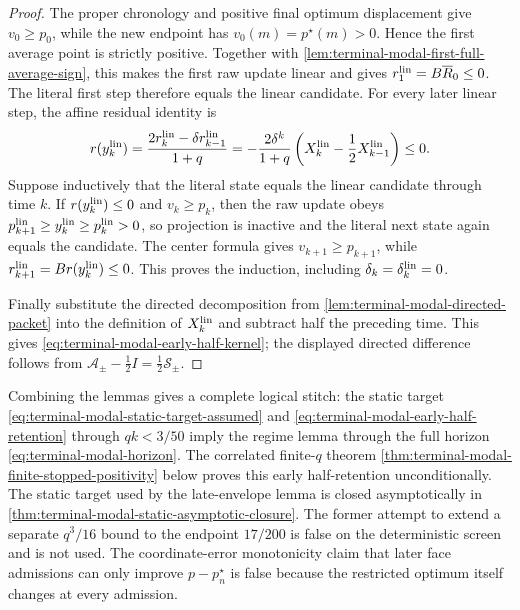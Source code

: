 \begin{proof}
The proper chronology and positive final optimum displacement give
$v_0\ge p_0$, while the new endpoint has
$v_0(m)=p^\star(m)>0$.  Hence the first average point is strictly positive.
Together with \cref{lem:terminal-modal-first-full-average-sign}, this makes
the first raw update linear and gives
$r_1^{\rm lin}=B\overline R_0\le0$.  The literal first step therefore equals
the linear candidate.  For every later linear step, the affine
residual identity is
\begin{equation}
 r(y_k^{\rm lin})
 =\frac{2r_k^{\rm lin}-\delta r_{k-1}^{\rm lin}}{1+q}
 =-\frac{2\delta^k}{1+q}
  \left(X_k^{\rm lin}-\frac12X_{k-1}^{\rm lin}\right)\le0.
 \label{eq:terminal-modal-half-average-residual}
\end{equation}
Suppose inductively that the literal state equals the linear candidate through
time $k$.  If $r(y_k^{\rm lin})\le0$ and $v_k\ge p_k$, then the raw update
obeys $p_{k+1}^{\rm lin}\ge y_k^{\rm lin}\ge p_k^{\rm lin}>0$, so projection
is inactive and the literal next state again equals the candidate.  The center
formula gives $v_{k+1}\ge p_{k+1}$, while
$r_{k+1}^{\rm lin}=Br(y_k^{\rm lin})\le0$.  This proves the induction,
including $\delta_k=\delta_k^{\rm lin}=0$.

Finally substitute the directed decomposition from
\cref{lem:terminal-modal-directed-packet} into the definition of
$X_k^{\rm lin}$ and
subtract half the preceding time.  This gives
\eqref{eq:terminal-modal-early-half-kernel}; the displayed directed
difference follows from
$\mathcal A_\pm-\frac12I=\frac12\mathcal S_\pm$.
\end{proof}

Combining the lemmas gives a complete logical stitch: the static target
\eqref{eq:terminal-modal-static-target-assumed} and
\eqref{eq:terminal-modal-early-half-retention} through $qk<3/50$
imply the regime lemma through the full horizon
\eqref{eq:terminal-modal-horizon}.  The correlated finite-$q$ theorem
\cref{thm:terminal-modal-finite-stopped-positivity} below proves this early
half-retention unconditionally.  The static target used by the
late-envelope lemma is closed asymptotically in
\cref{thm:terminal-modal-static-asymptotic-closure}.  The former attempt to extend a
separate $q^3/16$ bound to the endpoint $17/200$ is false on the deterministic
screen and is not used.  The coordinate-error monotonicity claim
that later face admissions can only improve $p-p_n^\star$ is false because
the restricted optimum itself changes at every admission.

